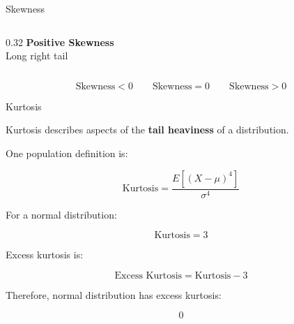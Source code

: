 \documentclass[aspectratio=169]{beamer}
\begin{document}
\begin{frame}{Skewness}
\begin{columns}
\begin{column}{0.32\textwidth}
\centering
\textbf{Positive Skewness}\\
Long right tail
\end{column}

\end{columns}

\vspace{0.2cm}

\[
\text{Skewness}<0
\qquad
\text{Skewness}=0
\qquad
\text{Skewness}>0
\]

\end{frame}
\begin{frame}{Kurtosis}

Kurtosis describes aspects of the \textbf{tail heaviness} of a
distribution.

One population definition is:

\[
\boxed{
\text{Kurtosis}
=
\frac{E[(X-\mu)^4]}{\sigma^4}
}
\]

For a normal distribution:

\[
\text{Kurtosis}=3
\]

Excess kurtosis is:

\[
\boxed{
\text{Excess Kurtosis}
=
\text{Kurtosis}-3
}
\]

Therefore, normal distribution has excess kurtosis:

\[
0
\]
\end{frame}
\end{document}
